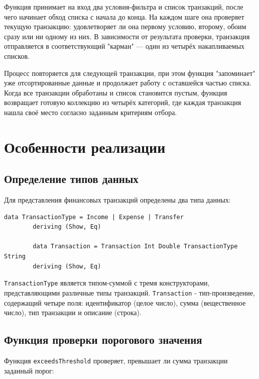 \documentclass[a4paper, final]{article}
\begin{document}
	\par Функция принимает на вход два условия-фильтра и список транзакций, после чего начинает обход списка с начала до конца. На каждом шаге она проверяет текущую транзакцию: удовлетворяет ли она первому условию, второму, обоим сразу или ни одному из них. В зависимости от результата проверки, транзакция отправляется в соответствующий "карман" — один из четырёх накапливаемых списков.
	
	\par Процесс повторяется для следующей транзакции, при этом функция "запоминает" уже отсортированные данные и продолжает работу с оставшейся частью списка. Когда все транзакции обработаны и список становится пустым, функция возвращает готовую коллекцию из четырёх категорий, где каждая транзакция нашла своё место согласно заданным критериям отбора.
	


	
	\newpage
	\section{Особенности реализации}
	
	\subsection{Определение типов данных}
	
	Для представления финансовых транзакций определены два типа данных:
	
	\begin{lstlisting}[caption={Определение типов данных для финансовых транзакций}, label={lst:types}]
		data TransactionType = Income | Expense | Transfer
		deriving (Show, Eq)
		
		data Transaction = Transaction Int Double TransactionType String
		deriving (Show, Eq)
	\end{lstlisting}
	
	\texttt{TransactionType} является типом-суммой с тремя конструкторами, представляющими различные типы транзакций. \texttt{Transaction} - тип-произведение, содержащий четыре поля: идентификатор (целое число), сумма (вещественное число), тип транзакции и описание (строка).
	
	\subsection{Функция проверки порогового значения}
	
	Функция \texttt{exceedsThreshold} проверяет, превышает ли сумма транзакции заданный порог:
	
\end{document}
